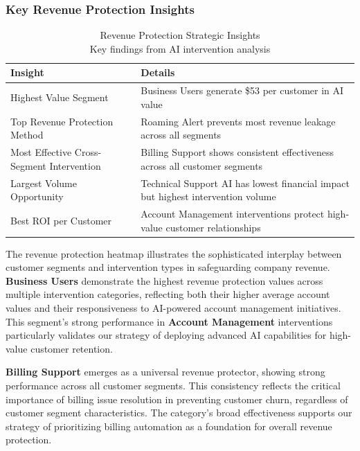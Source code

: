 \documentclass[
  letterpaper,
  DIV=11,
  numbers=noendperiod]{scrartcl}
\begin{document}
\subsubsection{Key Revenue Protection
Insights}\label{key-revenue-protection-insights}

\begin{table}
\caption*{
{\large Revenue Protection Strategic Insights} \\ 
{\small Key findings from AI intervention analysis}
} 
\fontsize{10.5pt}{12.6pt}\selectfont
\begin{tabular*}{\linewidth}{@{\extracolsep{\fill}}ll}
\toprule
Insight & Details \\ 
\midrule\addlinespace[2.5pt]
Highest Value Segment & Business Users generate \$53 per customer in AI value \\ 
Top Revenue Protection Method & Roaming Alert prevents most revenue leakage across all segments \\ 
Most Effective Cross-Segment Intervention & Billing Support shows consistent effectiveness across all customer segments \\ 
Largest Volume Opportunity & Technical Support AI has lowest financial impact but highest intervention volume \\ 
Best ROI per Customer & Account Management interventions protect high-value customer relationships \\ 
\bottomrule
\end{tabular*}
\end{table}

The revenue protection heatmap illustrates the sophisticated interplay
between customer segments and intervention types in safeguarding company
revenue. \textbf{Business Users} demonstrate the highest revenue
protection values across multiple intervention categories, reflecting
both their higher average account values and their responsiveness to
AI-powered account management initiatives. This segment's strong
performance in \textbf{Account Management} interventions particularly
validates our strategy of deploying advanced AI capabilities for
high-value customer retention.

\textbf{Billing Support} emerges as a universal revenue protector,
showing strong performance across all customer segments. This
consistency reflects the critical importance of billing issue resolution
in preventing customer churn, regardless of customer segment
characteristics. The category's broad effectiveness supports our
strategy of prioritizing billing automation as a foundation for overall
revenue protection.
\end{document}
